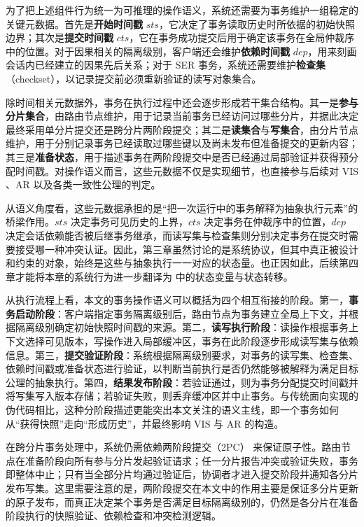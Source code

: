 为了把上述组件行为统一为可推理的操作语义，系统还需要为事务维护一组稳定的关键元数据。首先是\textbf{开始时间戳} $sts$，它决定了事务读取历史时所依据的初始快照边界；其次是\textbf{提交时间戳} $cts$，它在事务成功提交后用于确定该事务在全局仲裁序中的位置。对于因果相关的隔离级别，客户端还会维护\textbf{依赖时间戳} $dep$，用来刻画会话内已经建立的因果先后关系；对于 SER 事务，系统还需要维护\textbf{检查集}（checkset），以记录提交前必须重新验证的读写对象集合。

除时间相关元数据外，事务在执行过程中还会逐步形成若干集合结构。其一是\textbf{参与分片集合}，由路由节点维护，用于记录当前事务已经访问过哪些分片，并据此决定最终采用单分片提交还是跨分片两阶段提交；其二是\textbf{读集合}与\textbf{写集合}，由分片节点维护，用于分别记录事务已经读取过哪些键以及尚未发布但准备提交的更新内容；其三是\textbf{准备状态}，用于描述事务在两阶段提交中是否已经通过局部验证并获得预分配时间戳。对操作语义而言，这些元数据不仅是实现细节，也直接参与后续对 $\text{VIS}$、$\text{AR}$ 以及各类一致性公理的判定。

从语义角度看，这些元数据承担的是“把一次运行中的事务解释为抽象执行元素”的桥梁作用。$sts$ 决定事务可见历史的上界，$cts$ 决定事务在仲裁序中的位置，$dep$ 决定会话依赖能否被后继事务继承，而读写集与检查集则分别决定事务在提交时需要接受哪一种冲突认证。因此，第三章虽然讨论的是系统协议，但其中真正被设计和约束的对象，始终是这些与抽象执行一一对应的状态量。也正因如此，后续第四章才能将本章的系统行为进一步翻译为 \TLAPlus 中的状态变量与状态转移。

从执行流程上看，本文的事务操作语义可以概括为四个相互衔接的阶段。第一，\textbf{事务启动阶段}：客户端指定事务隔离级别后，路由节点为事务建立全局上下文，并根据隔离级别确定初始快照时间戳的来源。第二，\textbf{读写执行阶段}：读操作根据事务上下文选择可见版本，写操作进入局部缓冲区，事务在此阶段逐步形成读写集与依赖信息。第三，\textbf{提交验证阶段}：系统根据隔离级别要求，对事务的读写集、检查集、依赖时间戳或准备状态进行验证，以判断当前执行是否仍然能够被解释为满足目标公理的抽象执行。第四，\textbf{结果发布阶段}：若验证通过，则为事务分配提交时间戳并将写集写入版本存储；若验证失败，则丢弃缓冲区并中止事务。与传统面向实现的伪代码相比，这种分阶段描述更能突出本文关注的语义主线，即一个事务如何从“获得快照”走向“形成历史”，并最终影响 $\text{VIS}$ 与 $\text{AR}$ 的构造。

在跨分片事务处理中，系统仍需依赖两阶段提交（2PC）\cite{skeen1983formal} 来保证原子性。路由节点在准备阶段向所有参与分片发起验证请求；任一分片报告冲突或验证失败，事务即整体中止；只有当全部分片均通过验证后，协调者才进入提交阶段并通知各分片发布写集。这里需要注意的是，两阶段提交在本文中的作用主要是保证多分片更新的原子发布，而真正决定某个事务是否满足目标隔离级别的，仍然是各分片在准备阶段执行的快照验证、依赖检查和冲突检测逻辑。


